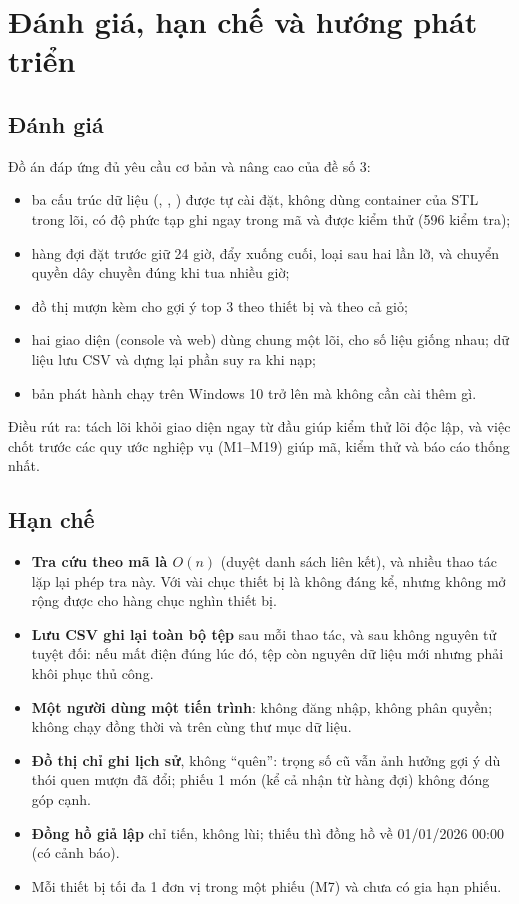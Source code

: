 \chapter{Đánh giá, hạn chế và hướng phát triển}

\section{Đánh giá}
Đồ án đáp ứng đủ yêu cầu cơ bản và nâng cao của đề số 3:
\begin{itemize}
  \item ba cấu trúc dữ liệu (, , ) được tự cài đặt, không dùng container của STL trong lõi, có độ phức tạp ghi ngay trong mã và được kiểm thử (596 kiểm tra);
  \item hàng đợi đặt trước giữ 24 giờ, đẩy xuống cuối, loại sau hai lần lỡ, và chuyển quyền dây chuyền đúng khi tua nhiều giờ;
  \item đồ thị mượn kèm cho gợi ý top 3 theo thiết bị và theo cả giỏ;
  \item hai giao diện (console và web) dùng chung một lõi, cho số liệu giống nhau; dữ liệu lưu CSV và dựng lại phần suy ra khi nạp;
  \item bản phát hành chạy trên Windows 10 trở lên mà không cần cài thêm gì.
\end{itemize}
Điều rút ra: tách lõi khỏi giao diện ngay từ đầu giúp kiểm thử lõi độc lập, và việc chốt trước các quy ước nghiệp vụ (M1--M19) giúp mã, kiểm thử và báo cáo thống nhất.

\section{Hạn chế}
\begin{itemize}
  \item \textbf{Tra cứu theo mã là $O(n)$} (duyệt danh sách liên kết), và nhiều thao tác lặp lại phép tra này. Với vài chục thiết bị là không đáng kể, nhưng không mở rộng được cho hàng chục nghìn thiết bị.
  \item \textbf{Lưu CSV ghi lại toàn bộ tệp} sau mỗi thao tác, và  sau  không nguyên tử tuyệt đối: nếu mất điện đúng lúc đó, tệp  còn nguyên dữ liệu mới nhưng phải khôi phục thủ công.
  \item \textbf{Một người dùng một tiến trình}: không đăng nhập, không phân quyền; không chạy đồng thời  và  trên cùng thư mục dữ liệu.
  \item \textbf{Đồ thị chỉ ghi lịch sử}, không ``quên'': trọng số cũ vẫn ảnh hưởng gợi ý dù thói quen mượn đã đổi; phiếu 1 món (kể cả nhận từ hàng đợi) không đóng góp cạnh.
  \item \textbf{Đồng hồ giả lập} chỉ tiến, không lùi; thiếu  thì đồng hồ về 01/01/2026 00:00 (có cảnh báo).
  \item Mỗi thiết bị tối đa 1 đơn vị trong một phiếu (M7) và chưa có gia hạn phiếu.
\end{itemize}

